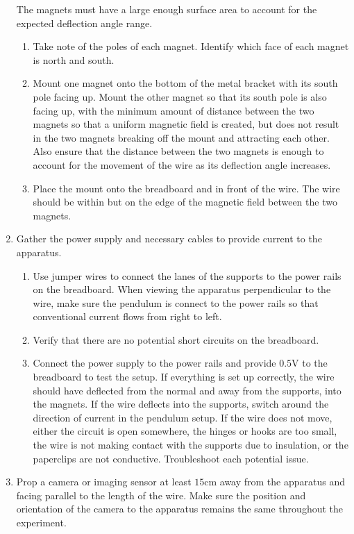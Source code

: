 \begin{enumerate}
	The magnets must have a large enough surface area to account for the expected deflection angle range.
	\begin{enumerate}
		\item Take note of the poles of each magnet.
		Identify which face of each magnet is north and south.
		\item Mount one magnet onto the bottom of the metal bracket with its south pole facing up.
		Mount the other magnet so that its south pole is also facing up, with the minimum amount of distance between the two magnets so that a uniform magnetic field is created, but does not result in the two magnets breaking off the mount and attracting each other.
		Also ensure that the distance between the two magnets is enough to account for the movement of the wire as its deflection angle increases.
		\item Place the mount onto the breadboard and in front of the wire.
		The wire should be within but on the edge of the magnetic field between the two magnets.
	\end{enumerate}
	\item Gather the power supply and necessary cables to provide current to the apparatus.
	\begin{enumerate}
		\item Use jumper wires to connect the lanes of the supports to the power rails on the breadboard.
		When viewing the apparatus perpendicular to the wire, make sure the pendulum is connect to the power rails so that conventional current flows from right to left.
		\item Verify that there are no potential short circuits on the breadboard.
		\item Connect the power supply to the power rails and provide $0.5\si{\volt}$ to the breadboard to test the setup.
		If everything is set up correctly, the wire should have deflected from the normal and away from the supports, into the magnets.
		If the wire deflects into the supports, switch around the direction of current in the pendulum setup.
		If the wire does not move, either the circuit is open somewhere, the hinges or hooks are too small, the wire is not making contact with the supports due to insulation, or the paperclips are not conductive.
		Troubleshoot each potential issue.
	\end{enumerate}
	\item Prop a camera or imaging sensor at least $15\si{\centi\meter}$ away from the apparatus and facing parallel to the length of the wire.
	Make sure the position and orientation of the camera to the apparatus remains the same throughout the experiment.

\end{enumerate}
